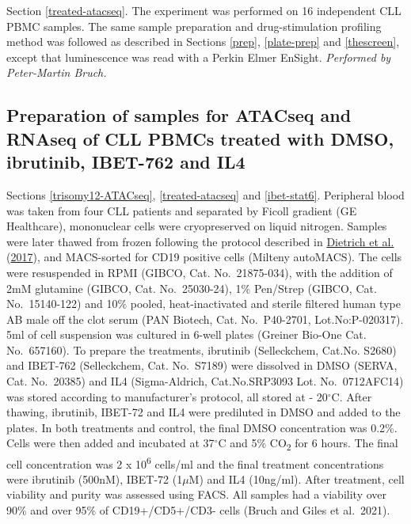 \documentclass[11pt, a4paper, twosided]{book}
\begin{document}
Section \ref{treated-atacseq}. The experiment was performed on 16 independent CLL PBMC samples. The same sample preparation and drug-stimulation profiling method was followed as described in Sections \ref{prep}, \ref{plate-prep} and \ref{thescreen}, except that luminescence was read with a Perkin Elmer EnSight. \emph{Performed by Peter-Martin Bruch. }

\hypertarget{preparation-of-samples-for-atacseq-and-rnaseq-of-cll-pbmcs-treated-with-dmso-ibrutinib-ibet-762-and-il4}{%
\subsection{Preparation of samples for ATACseq and RNAseq of CLL PBMCs treated with DMSO, ibrutinib, IBET-762 and IL4}\label{preparation-of-samples-for-atacseq-and-rnaseq-of-cll-pbmcs-treated-with-dmso-ibrutinib-ibet-762-and-il4}}

Sections \ref{trisomy12-ATACseq}, \ref{treated-atacseq} and \ref{ibet-stat6}. Peripheral blood was taken from four CLL patients and separated by Ficoll gradient (GE Healthcare), mononuclear cells were cryopreserved on liquid nitrogen. Samples were later thawed from frozen following the protocol described in \protect\hyperlink{ref-JCIpaper}{Dietrich et al.} (\protect\hyperlink{ref-JCIpaper}{2017}), and MACS-sorted for CD19 positive cells (Milteny autoMACS). The cells were resuspended in RPMI (GIBCO, Cat. No.~21875-034), with the addition of 2mM glutamine (GIBCO, Cat. No.~25030-24), 1\% Pen/Strep (GIBCO, Cat. No.~15140-122) and 10\% pooled, heat-inactivated and sterile filtered human type AB male off the clot serum (PAN Biotech, Cat. No.~P40-2701, Lot.No:P-020317). 5ml of cell suspension was cultured in 6-well plates (Greiner Bio-One Cat. No.~657160). To prepare the treatments, ibrutinib (Selleckchem, Cat.No. S2680) and IBET-762 (Selleckchem, Cat. No.~S7189) were dissolved in DMSO (SERVA, Cat. No.~20385) and IL4 (Sigma-Aldrich, Cat.No.SRP3093 Lot. No.~0712AFC14) was stored according to manufacturer's protocol, all stored at - 20\(^\circ\)C. After thawing, ibrutinib, IBET-72 and IL4 were prediluted in DMSO and added to the plates. In both treatments and control, the final DMSO concentration was 0.2\%. Cells were then added and incubated at 37\(^\circ\)C and 5\% CO\textsubscript{2} for 6 hours. The final cell concentration was 2 x 10\textsuperscript{6} cells/ml and the final treatment concentrations were ibrutinib (500nM), IBET-72 (1\(\mu\)M) and IL4 (10ng/ml). After treatment, cell viability and purity was assessed using FACS. All samples had a viability over 90\% and over 95\% of CD19+/CD5+/CD3- cells (Bruch and Giles et al.~2021).
\end{document}
